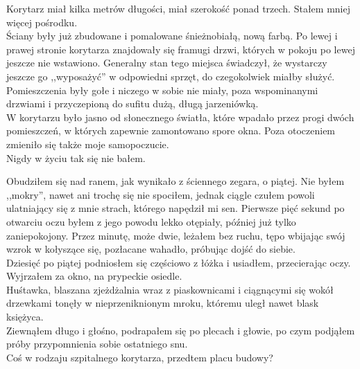 \documentclass[../MAIN.tex]{subfiles}
\begin{document}
Korytarz miał kilka metrów długości, miał szerokość ponad trzech. Stałem mniej więcej pośrodku.\\
Ściany były już zbudowane i pomalowane śnieżnobiałą, nową farbą. Po lewej i prawej stronie korytarza znajdowały się framugi drzwi, których w pokoju po lewej jeszcze nie wstawiono. Generalny stan tego miejsca świadczył, że wystarczy jeszcze go ,,wyposażyć'' w odpowiedni sprzęt, do czegokolwiek miałby służyć. Pomieszczenia były gołe i niczego w sobie nie miały, poza wspominanymi drzwiami i przyczepioną do sufitu dużą, długą jarzeniówką.\\
W korytarzu było jasno od słonecznego światła, które wpadało przez progi dwóch pomieszczeń, w których zapewnie zamontowano spore okna.
Poza otoczeniem zmieniło się także moje samopoczucie.\\
Nigdy w życiu tak się nie bałem.

Obudziłem się nad ranem, jak wynikało z ściennego zegara, o piątej. Nie byłem ,,mokry'', nawet ani trochę się nie spociłem, jednak ciągle czułem powoli ulatniający się z mnie strach, którego napędził mi sen. Pierwsze pięć sekund po otwarciu oczu byłem z jego powodu lekko otępiały, później już tylko zaniepokojony. Przez minutę, może dwie, leżałem bez ruchu, tępo wbijając swój wzrok w kołyszące się, pozłacane wahadło, próbując dojść do siebie.\\
Dziesięć po piątej podniosłem się częściowo z łóżka i usiadłem, przecierając oczy. Wyjrzałem za okno, na prypeckie osiedle.\\ Huśtawka, blaszana zjeżdżalnia wraz z piaskownicami i ciągnącymi się wokół drzewkami tonęły w nieprzeniknionym mroku, któremu uległ nawet blask księżyca.\\
Ziewnąłem długo i głośno, podrapałem się po plecach i głowie, po czym podjąłem próby przypomnienia sobie ostatniego snu.\\
Coś w rodzaju szpitalnego korytarza, przedtem placu budowy?
\end{document}
